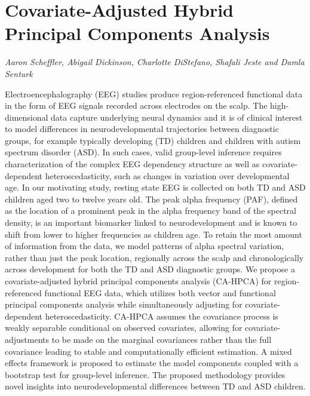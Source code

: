 \documentclass[../booklet.tex]{subfiles}
\begin{document}
\section[Covariate-Adjusted Hybrid Principal Components Analysis. {\it Aaron Scheffler, Abigail Dickinson, Charlotte DiStefano, Shafali Jeste and Damla Senturk}]{Covariate-Adjusted Hybrid Principal Components Analysis}
    

\begin{center}
  {\it Aaron Scheffler, Abigail Dickinson, Charlotte DiStefano, Shafali Jeste and Damla Senturk}
\end{center}

\vskip 0.8cm


Electroencephalography (EEG) studies produce region-referenced functional data in the form of EEG signals recorded across electrodes on the scalp. The high-dimensional data capture underlying neural dynamics and it is of clinical interest to model differences in neurodevelopmental trajectories between diagnostic groups, for example typically developing (TD) children and children with autism spectrum disorder (ASD). In such cases, valid group-level inference requires characterization of the complex EEG dependency structure as well as covariate-dependent heteroscedasticity, such as changes in variation over developmental age. In our motivating study, resting state EEG is collected on both TD and ASD children aged two to twelve years old. The peak alpha frequency (PAF), defined as the location of a prominent peak in the alpha frequency band of the spectral density, is an important biomarker linked to neurodevelopment and is known to shift from lower to higher frequencies as children age. To retain the most amount of information from the data, we model patterns of alpha spectral variation, rather than just the peak location, regionally across the scalp and chronologically across development for both the TD and ASD diagnostic groups. We propose a covariate-adjusted hybrid principal components analysis (CA-HPCA) for region-referenced functional EEG data, which utilizes both vector and functional principal components analysis while simultaneously adjusting for covariate-dependent heteroscedasticity. CA-HPCA assumes the covariance process is weakly separable conditional on observed covariates, allowing for covariate-adjustments to be made on the marginal covariances rather than the full covariance leading to stable and computationally efficient estimation. A mixed effects framework is proposed to estimate the model components coupled with a bootstrap test for group-level inference. The proposed methodology provides novel insights into neurodevelopmental differences between TD and ASD children. 

\end{document}
